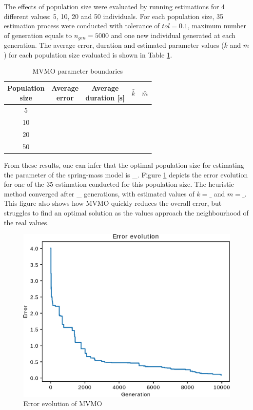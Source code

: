 The effects of population size were evaluated by running estimations for 4 different values: 5, 10, 20 and 50 individuals. For each population size, 35 estimation process were conducted with tolerance of $tol = 0.1$, maximum number of generation equals to $n_{gen}=5000$ and one new individual generated at each generation. The average error, duration and estimated parameter values ($\bar{k}$ and $\bar{m}$) for each population size evaluated is shown in Table \ref{tab: spring_mass_MVMO_size}.

\begin{table}[!h]
	\centering
	\caption{MVMO parameter boundaries}
	\begin{tabular}{c|cccc}
		\shortstack{Population \\ size} & \shortstack{Average \\ error} & \shortstack{Average \\ duration [s]} & $\bar{k}$ & $\bar{m}$ \\
		\hline
		5 &  &  &  & \\
		10 &  &  &  & \\
		20 &  &  &  & \\
		50 &  &  &  & \\
	\end{tabular}
	\label{tab: spring_mass_MVMO_size}
\end{table}

From these results, one can infer that the optimal population size for estimating the parameter of the spring-mass model is \_. Figure \ref{fig: MVMO_conv} depicts the error evolution for one of the 35 estimation conducted for this population size. The heuristic method converged after \_ generations, with estimated values of $k=\_$ and $m=\_$. This figure also shows how MVMO quickly reduces the overall error, but struggles to find an optimal solution as the values approach the neighbourhood of the real values.

\begin{figure}[h]
	\caption{Error evolution of MVMO}
	\begin{center}
		\includegraphics[scale=0.6]{Images/MVMO_conv.eps}
	\end{center}
	\label{fig: MVMO_conv}
\end{figure}

